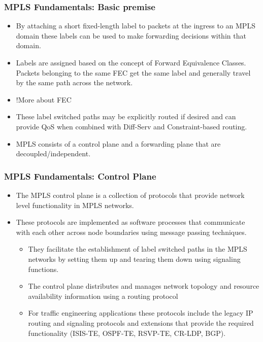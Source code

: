 \documentclass[12pt]{beamer}
\begin{document}
\begin{frame}
  \frametitle{MPLS Fundamentals: Basic premise}
  \begin{itemize}
    \item By attaching a short fixed-length label to packets at the ingress to an MPLS domain these labels can be used to make forwarding decisions within that domain.
    \item Labels are assigned based on the concept of Forward Equivalence Classes. Packets belonging to the same FEC get the same label and generally travel by the same path across the network.
    \item !More about FEC
    \item These label switched paths may be explicitly routed if desired and can provide QoS when combined with Diff-Serv and Constraint-based routing.
    \item MPLS consists of a control plane and a forwarding plane that are decoupled/independent.    
    \end{itemize}
\end{frame}

\begin{frame}
  \frametitle{MPLS Fundamentals: Control Plane}
  \begin{itemize}
    \item The MPLS control plane is a collection of protocols that provide network level functionality in MPLS networks.
    \item These protocols are implemented as software processes that communicate with each other across node boundaries using message passing techniques.
    \begin{itemize}
      \item They facilitate the establishment of label switched paths in the MPLS networks by setting them up and tearing them down using signaling functions.
      \item The control plane distributes and manages network topology and resource availability information using a routing protocol
      \item For traffic engineering applications these protocols include the legacy IP routing and signaling protocols and extensions that provide the required functionality (ISIS-TE, OSPF-TE, RSVP-TE, CR-LDP, BGP).
    \end{itemize}
  \end{itemize}
\end{frame}
\end{document}

